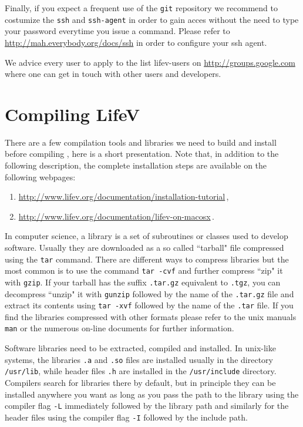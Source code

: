 Finally, if you expect a frequent use of the \verb!git! repository 
we recommend to costumize the 
\verb!ssh! and \verb!ssh-agent!
 in order to gain acces  without the need to type your password everytime you issue
a command. Please refer to \url{http://mah.everybody.org/docs/ssh} in order to configure
your ssh agent.

We advice every user to apply to the list lifev-users on \url{http://groups.google.com} 
where one can get in touch with other users and developers.  

\section{Compiling LifeV}
\label{compile-lifev}

There are a few compilation tools and libraries we need to build and install before 
compiling \lifev, here is a short presentation. Note that, in addition to the following description, the complete installation steps are available on the following webpages:
\begin{enumerate}
\item \url{http://www.lifev.org/documentation/installation-tutorial}\,,
\item \url{http://www.lifev.org/documentation/lifev-on-macosx}\,.
\end{enumerate}



In computer science, a library is a set of subroutines or classes used to develop software. 
Usually they are downloaded as a so called ``tarball" file  
compressed using the \verb!tar! command. There are different ways to compress 
libraries but the most common is to use the command \verb!tar -cvf! and further compress 
``zip" it with \verb!gzip!. If your tarball has the suffix \verb!.tar.gz! equivalent to \verb!.tgz!,
you can decompress ``unzip" it with \verb!gunzip! followed by the name of the \verb!.tar.gz! file and 
extract its contents using \verb!tar -xvf! followed by the name of the \verb!.tar! file.
If you find the libraries compressed with other formats 
please refer to the unix manuals \verb!man! or the numerous 
on-line documents for further information. 

Software libraries need to be extracted, compiled and installed. In unix-like 
systems, the libraries \verb!.a! and 
\verb!.so! files are installed usually in the directory \verb!/usr/lib!, 
 while header files 
\verb!.h! are installed in the \verb!/usr/include! directory. Compilers search  
for libraries there by default, but in principle they can be installed anywhere you want 
as long as you pass the path to the library using the compiler flag \verb!-L! immediately 
followed by the library path and similarly for the header files using the compiler 
flag \verb!-I! followed by the include path. 

